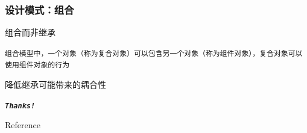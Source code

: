 \documentclass[UTF8, 16pt]{beamer}
\begin{document}
\begin{frame}
    \frametitle{设计模式：组合}
    \textcolor{sufered}{组合而非继承}

    \texttt{组合模型中，一个对象（称为复合对象）可以包含另一个对象（称为组件对象），复合对象可以使用组件对象的行为}

    \textcolor{sufered}{降低继承可能带来的耦合性}
\end{frame}






\begin{frame}[allowframebreaks]%
    \begin{center}
        \Huge\textbf{\textit{\texttt{Thanks!}}}
    \end{center}
\end{frame}

\appendix
\begin{frame}{Reference}
    \nocite{corejava}
    \nocite{liaoxuefeng}
    \addtocounter{framenumber}{-1}
    \printbibliography{} %
\end{frame}

\end{document}

